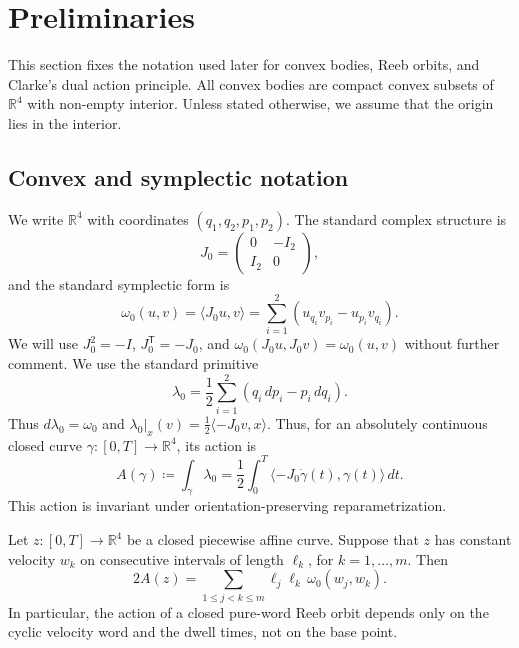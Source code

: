 \section{Preliminaries}\label{sec:preliminaries}

This section fixes the notation used later for convex bodies, Reeb orbits, and
Clarke's dual action principle. All convex bodies are compact convex subsets of
\(\mathbb{R}^4\) with non-empty interior. Unless stated otherwise, we assume
that the origin lies in the interior.

\subsection{Convex and symplectic notation}\label{subsec:preliminaries-polytopes}

We write \(\mathbb{R}^4\) with coordinates \((q_1,q_2,p_1,p_2)\). The standard
complex structure is
\[
  J_0 =
  \begin{pmatrix}
    0 & -I_2 \\
    I_2 & 0
  \end{pmatrix},
\]
and the standard symplectic form is
\[
  \omega_0(u,v) = \langle J_0u,v\rangle
  = \sum_{i=1}^2 (u_{q_i}v_{p_i}-u_{p_i}v_{q_i}).
\]
We will use \(J_0^2=-I\), \(J_0^{\mathsf T}=-J_0\), and
\(\omega_0(J_0u,J_0v)=\omega_0(u,v)\) without further comment.
We use the standard primitive
\[
  \lambda_0 = \frac{1}{2}\sum_{i=1}^2(q_i\,dp_i-p_i\,dq_i).
\]
Thus \(d\lambda_0=\omega_0\) and
\(\lambda_0|_x(v)=\frac12\langle -J_0v,x\rangle\).
Thus, for an absolutely continuous closed curve
\(\gamma\colon[0,T]\to\mathbb{R}^4\), its action is
\begin{equation}\label{eq:preliminaries-action}
  A(\gamma) \coloneqq \int_\gamma \lambda_0
  = \frac{1}{2}\int_0^T
    \langle -J_0\dot{\gamma}(t),\gamma(t)\rangle\,dt.
\end{equation}
This action is invariant under orientation-preserving reparametrization.

\begin{lemma}\label{lem:preliminaries-shoelace}
Let \(z\colon[0,T]\to\mathbb{R}^4\) be a closed piecewise affine curve. Suppose
that \(z\) has constant velocity \(w_k\) on consecutive intervals of length
\(\ell_k\), for \(k=1,\ldots,m\). Then
\begin{equation}\label{eq:preliminaries-shoelace}
  2A(z)
  =
  \sum_{1\leq j<k\leq m}
    \ell_j\ell_k\,\omega_0(w_j,w_k).
\end{equation}
In particular, the action of a closed pure-word Reeb orbit depends only on the
cyclic velocity word and the dwell times, not on the base point.
\end{lemma}

